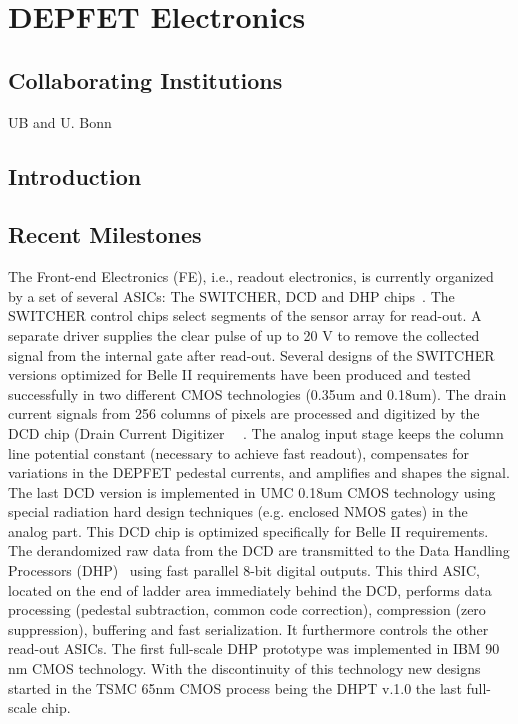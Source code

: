 \section{DEPFET Electronics}
\subsection{Collaborating Institutions}
UB and U. Bonn
\subsection{Introduction}
\subsection{Recent Milestones}
The Front-end Electronics (FE), i.e., readout electronics, is currently organized by a set of several ASICs: The SWITCHER, DCD and DHP chips~\cite{Krueger2010337}.
The SWITCHER control chips select segments of the sensor array for read-out. A separate driver supplies the clear pulse of up to 20 V to remove the collected signal from the internal gate after read-out. Several designs of the SWITCHER versions optimized for Belle II requirements have been produced and tested successfully in two different CMOS technologies (0.35um and 0.18um). The drain current signals from 256 columns of pixels are processed and digitized by the DCD chip (Drain Current Digitizer ~\cite{1748-0221-6-01-C01085}~\cite{5446501}.
The analog input stage keeps the column line potential constant (necessary to achieve fast readout), compensates for variations in the DEPFET pedestal currents, and amplifies and shapes the signal. The last DCD version is implemented in UMC 0.18um CMOS technology using special radiation hard design techniques (e.g. enclosed NMOS gates) in the analog part. This DCD chip is optimized specifically for Belle II requirements. The derandomized raw data from the DCD are transmitted to the Data Handling Processors (DHP)~\cite{1748-0221-7-01-C01069} using fast parallel 8-bit digital outputs.
This third ASIC, located on the end of ladder area immediately behind the DCD, performs data processing (pedestal subtraction, common code correction), compression (zero suppression), buffering and fast serialization. It furthermore controls the other read-out ASICs.
The first full-scale DHP prototype was implemented in IBM 90 nm CMOS technology. With the discontinuity of this technology new designs started in the TSMC 65nm CMOS process being the DHPT v.1.0 the last full-scale chip.
